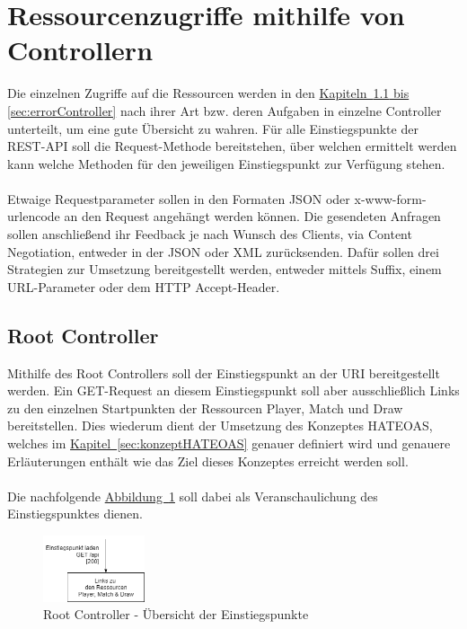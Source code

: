 \section{Ressourcenzugriffe mithilfe von Controllern}
Die einzelnen Zugriffe auf die Ressourcen werden in den \hyperref[sec:rootController, sec:errorController]{Kapiteln~\ref{sec:rootController} bis \ref{sec:errorController}} nach ihrer Art bzw. deren Aufgaben in einzelne Controller unterteilt, um eine gute Übersicht zu wahren. Für alle Einstiegspunkte der \gls{REST}-\gls{API} soll die Request-Methode  bereitstehen, über welchen ermittelt werden kann welche Methoden für den jeweiligen Einstiegspunkt zur Verfügung stehen.\\
\\
Etwaige Requestparameter sollen in den Formaten \gls{JSON} oder x-www-form-urlencode an den Request angehängt werden können. Die gesendeten Anfragen sollen anschließend ihr Feedback je nach Wunsch des Clients, via Content Negotiation, entweder in der \gls{JSON} oder \gls{XML} zurücksenden. Dafür sollen drei Strategien zur Umsetzung bereitgestellt werden, entweder mittels Suffix, einem URL-Parameter oder dem \gls{HTTP} Accept-Header. 

\subsection{Root Controller}\label{sec:rootController}
Mithilfe des Root Controllers soll der Einstiegspunkt an der \gls{URI}  bereitgestellt werden. Ein GET-Request an diesem Einstiegspunkt soll aber ausschließlich Links zu den einzelnen Startpunkten der Ressourcen Player, Match und Draw bereitstellen. Dies wiederum dient der Umsetzung des Konzeptes HATEOAS, welches im \hyperref[sec:konzeptHATEOAS]{Kapitel~\ref{sec:konzeptHATEOAS}} genauer definiert wird und genauere Erläuterungen enthält wie das Ziel dieses Konzeptes erreicht werden soll.\\
\\
Die nachfolgende \hyperref[fig:rootController]{Abbildung~\ref{fig:rootController}} soll dabei als Veranschaulichung des Einstiegspunktes dienen.
\begin{figure}[htb]
	\includegraphics[width=0.266\textwidth]{images/root-controller.png}
	\caption{Root Controller - Übersicht der Einstiegspunkte}
	\label{fig:rootController}
\end{figure}

